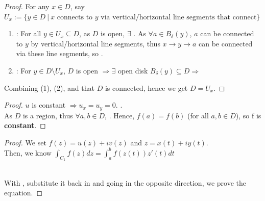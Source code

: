 \documentclass[12pt,a4paper]{article}
\begin{document}

\begin{proof}
  For any $x \in D$, say $U_x := \{y \in D\ |\ x \text{ connects to } y \text{ via vertical/horizontal line segments that connect}\}$

  \begin{enumerate}
    \item {}: For all $y \in U_x \subseteq D$, as $D$ is open, $\exists$ . As $\forall a \in B_\delta(y)$, $a$ can be connected to $y$ by vertical/horizontal line segments, thus $x \to y \to a$ can be connected via these line segments, so .
    \item {}: For $y \in D \setminus U_x$, $D$ is open $\Rightarrow \exists$ open disk $B_\delta(y) \subseteq D \Rightarrow$  
  \end{enumerate}

  \noindent Combining (1), (2), and that $D$ is connected, hence we get $\boxed{D = U_x}$.
\end{proof}


\begin{proof}
  $u$ is constant $\Rightarrow u_x = u_y = 0$. . \\

  \noindent As $D$ is a region, thus $\forall a, b \in D$, . Hence, $f(a) = f(b)$ (for all $a, b \in D$), so f is \textbf{constant}.
\end{proof}

\vspace{1.0em}


\begin{proof}
  We set $f(z) = u(z) + iv(z)$ and $z = x(t) + iy(t)$. \\

  \noindent Then, we know $\int_{C_1} f(z) dz = \int_a^b f(z(t)) z'(t) dt$ 
  
   \\

  \noindent With , substitute it back in and going in the opposite direction, we prove the equation.
\end{proof}
\end{document}
